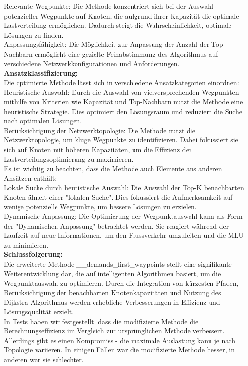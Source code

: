 \documentclass[sigconf, nonacm, review]{acmart}
\begin{document}
Relevante Wegpunkte: Die Methode konzentriert sich bei der Auswahl potenzieller Wegpunkte auf Knoten, die aufgrund ihrer Kapazität die optimale Lastverteilung ermöglichen. Dadurch steigt die Wahrscheinlichkeit, optimale Lösungen zu finden.\\
Anpassungsfähigkeit: Die Möglichkeit zur Anpassung der Anzahl der Top-Nachbarn ermöglicht eine gezielte Feinabstimmung des Algorithmus auf verschiedene Netzwerkkonfigurationen und Anforderungen.\\
\textbf{Ansatzklassifizierung:}\\
Die optimierte Methode lässt sich in verschiedene Ansatzkategorien einordnen:\\
Heuristische Auswahl: Durch die Auswahl von vielversprechenden Wegpunkten mithilfe von Kriterien wie Kapazität und Top-Nachbarn nutzt die Methode eine heuristische Strategie. Dies optimiert den Lösungsraum und reduziert die Suche nach optimalen Lösungen.\\
Berücksichtigung der Netzwerktopologie: Die Methode nutzt die Netzwerktopologie, um kluge Wegpunkte zu identifizieren. Dabei fokussiert sie sich auf Knoten mit höheren Kapazitäten, um die Effizienz der Lastverteilungsoptimierung zu maximieren.\\
Es ist wichtig zu beachten, dass die Methode auch Elemente aus anderen Ansätzen enthält:\\
Lokale Suche durch heuristische Auswahl: Die Auswahl der Top-K benachbarten Knoten ähnelt einer "lokalen Suche". Dies fokussiert die Aufmerksamkeit auf wenige potenzielle Wegpunkte, um bessere Lösungen zu erzielen.\\
Dynamische Anpassung: Die Optimierung der Wegpunktauswahl kann als Form der "Dynamischen Anpassung" betrachtet werden. Sie reagiert während der Laufzeit auf neue Informationen, um den Flussverkehr umzuleiten und die MLU zu minimieren.\\
\textbf{Schlussfolgerung:}\\
Die erweiterte Methode \_\_demands\_first\_waypoints stellt eine signifikante Weiterentwicklung dar, die auf intelligenten Algorithmen basiert, um die Wegpunktauswahl zu optimieren. Durch die Integration von kürzesten Pfaden, Berücksichtigung der benachbarten Knotenkapazitäten und Nutzung des Dijkstra-Algorithmus werden erhebliche Verbesserungen in Effizienz und Lösungsqualität erzielt.\\
In Tests haben wir festgestellt, dass die modifizierte Methode die Berechnungseffizienz im Vergleich zur ursprünglichen Methode verbessert. Allerdings gibt es einen Kompromiss - die maximale Auslastung kann je nach Topologie variieren. In einigen Fällen war die modifizierte Methode besser, in anderen war sie schlechter.
\end{document}
